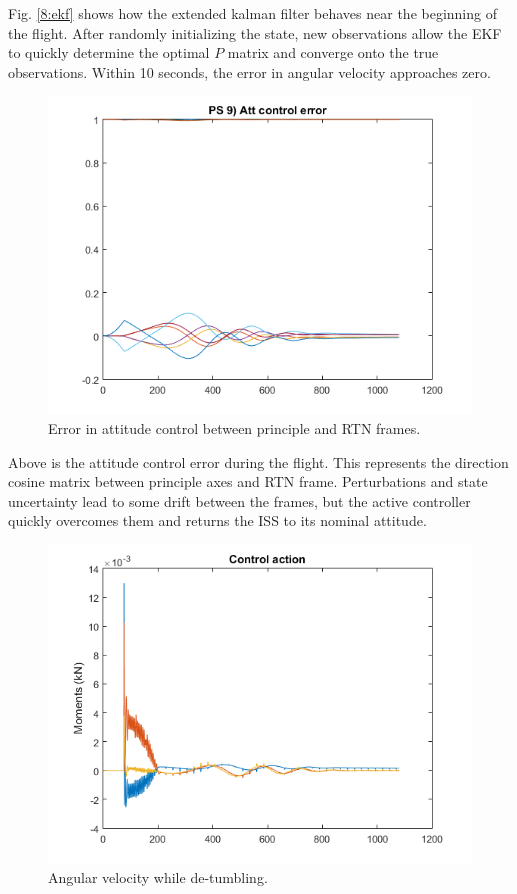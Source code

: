 \documentclass[12pt, letterpaper]{article}
\begin{document}
Fig. \ref{8:ekf} shows how the extended kalman filter behaves near the beginning of the flight. After randomly initializing the state, new observations allow the EKF to quickly determine the optimal $P$ matrix and converge onto the true observations. Within 10 seconds, the error in angular velocity approaches zero.

\begin{figure}[H]
	\centering
	\includegraphics[scale=0.9]{ps8_03}
	\caption{Error in attitude control between principle and RTN frames.}
	\label{8:attError}
\end{figure}

Above is the attitude control error during the flight. This represents the direction cosine matrix between principle axes and RTN frame. Perturbations and state uncertainty lead to some drift between the frames, but the active controller quickly overcomes them and returns the ISS to its nominal attitude.

\begin{figure}[H]
	\centering
	\includegraphics[scale=0.9]{ps8_04}
	\caption{Angular velocity while de-tumbling.}
	\label{8:angvel}
\end{figure}
\end{document}
